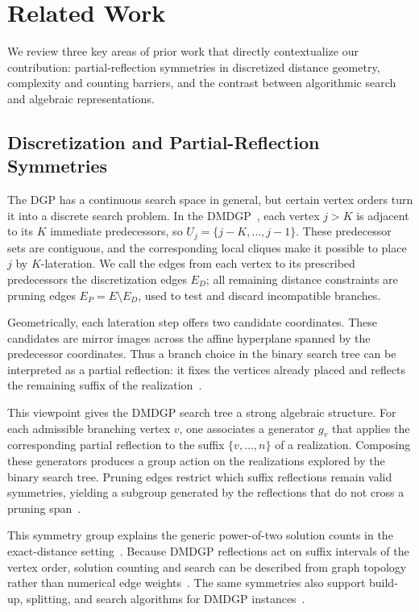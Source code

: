 \section{Related Work}
\label{sec:related}

We review three key areas of prior work that directly contextualize our contribution: partial-reflection symmetries in discretized distance geometry, complexity and counting barriers, and the contrast between algorithmic search and algebraic representations.

\subsection{Discretization and Partial-Reflection Symmetries}
The DGP has a continuous search space in general, but certain vertex orders turn it into a discrete search problem. In the DMDGP~\cite{lavor2012discretizable}, each vertex $j>K$ is adjacent to its $K$ immediate predecessors, so $U_j = \{j-K, \ldots, j-1\}$. These predecessor sets are contiguous, and the corresponding local cliques make it possible to place $j$ by $K$-lateration. We call the edges from each vertex to its prescribed predecessors the discretization edges $E_D$; all remaining distance constraints are pruning edges $E_P=E\setminus E_D$, used to test and discard incompatible branches.

Geometrically, each lateration step offers two candidate coordinates. These candidates are mirror images across the affine hyperplane spanned by the predecessor coordinates. Thus a branch choice in the binary search tree can be interpreted as a partial reflection: it fixes the vertices already placed and reflects the remaining suffix of the realization~\cite{mucherino2012exploiting}.

This viewpoint gives the DMDGP search tree a strong algebraic structure. For each admissible branching vertex $v$, one associates a generator $g_v$ that applies the corresponding partial reflection to the suffix $\{v,\ldots,n\}$ of a realization. Composing these generators produces a group action on the realizations explored by the binary search tree. Pruning edges restrict which suffix reflections remain valid symmetries, yielding a subgroup generated by the reflections that do not cross a pruning span~\cite{mucherino2012exploiting,liberti2013counting}.

This symmetry group explains the generic power-of-two solution counts in the exact-distance setting~\cite{liberti2011number,liberti2014number}. Because DMDGP reflections act on suffix intervals of the vertex order, solution counting and search can be described from graph topology rather than numerical edge weights~\cite{lavor2021optimality}. The same symmetries also support build-up, splitting, and search algorithms for DMDGP instances~\cite{mucherino2012exploiting,goncalves2021new}. 

